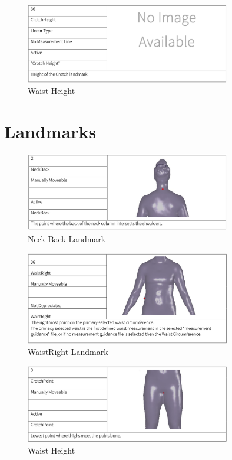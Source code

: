 \begin{figure} [H]
    \centering
    \includegraphics[width = 0.8\textwidth]{Images/CrotchHeight measurment.png}
    \caption{Waist Height}
\end{figure}

\section{Landmarks}
\begin{figure} [H]
    \centering
    \includegraphics[width = 0.8\textwidth]{Images/NeckBack landmark.png}
    \caption{Neck Back Landmark}
\end{figure}
\begin{figure} [H]
    \centering
    \includegraphics[width = 0.8\textwidth]{Images/WaistRight landmark.png}
    \caption{WaistRight Landmark}
\end{figure}
\begin{figure} [H]
    \centering
    \includegraphics[width = 0.8\textwidth]{Images/CrotchPoint landmark.png}
    \caption{Waist Height}
\end{figure}
